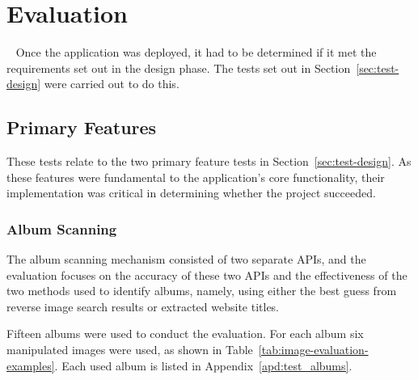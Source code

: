 \chapter{Evaluation}~\label{cha:evaluation}
Once the application was deployed, it had to be determined if it met the requirements set out in the design phase. The tests set out in Section~\ref{sec:test-design} were carried out to do this.

\section{Primary Features}
These tests relate to the two primary feature tests in Section~\ref{sec:test-design}. As these features were fundamental to the application's core functionality, their implementation was critical in determining whether the project succeeded.

\subsection{Album Scanning}
The album scanning mechanism consisted of two separate APIs, and the evaluation focuses on the accuracy of these two APIs and the effectiveness of the two methods used to identify albums, namely, using either the best guess from reverse image search results or extracted website titles.

Fifteen albums were used to conduct the evaluation. For each album six manipulated images were used, as shown in Table~\ref{tab:image-evaluation-examples}.
\ifshowappendix
Each used album is listed in Appendix~\ref{apd:test_albums}.
\fi

